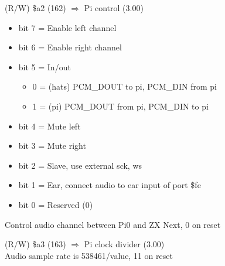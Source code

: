 (R/W) \$a2 (162) $\Rightarrow$ Pi \iis control (3.00)
\begin{itemize}
\item bit 7 = Enable left channel
\item bit 6 = Enable right channel
\item bit 5 = In/out
  \begin{itemize}
  \item[] 0 = (hats) PCM\_DOUT to pi, PCM\_DIN from pi
  \item[] 1 = (pi) PCM\_DOUT from pi, PCM\_DIN to pi
  \end{itemize}
\item bit 4 = Mute left
\item bit 3 = Mute right
\item bit 2 = Slave, use external sck, ws
\item bit 1 = Ear, connect audio to ear input of port \$fe
\item bit 0 = Reserved (0)
\end{itemize}
Control audio channel between Pi0 and ZX Next, 0 on reset

(R/W) \$a3 (163) $\Rightarrow$ Pi \iis clock divider (3.00)\\
Audio sample rate is 538461/value, 11 on reset

